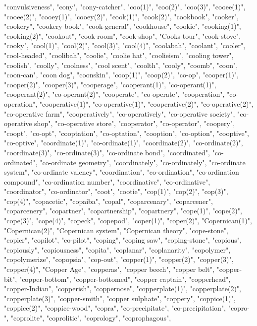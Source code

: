 "convulsiveness",
"cony",
"cony-catcher",
"coo(1)",
"coo(2)",
"coo(3)",
"cooee(1)",
"cooee(2)",
"cooey(1)",
"cooey(2)",
"cook(1)",
"cook(2)",
"cookbook",
"cooker",
"cookery",
"cookery book",
"cook-general",
"cookhouse",
"cookie",
"cooking(1)",
"cooking(2)",
"cookout",
"cook-room",
"cook-shop",
"Cooks tour",
"cook-stove",
"cooky",
"cool(1)",
"cool(2)",
"cool(3)",
"cool(4)",
"coolabah",
"coolant",
"cooler",
"cool-headed",
"coolibah",
"coolie",
"coolie hat",
"coolieism",
"cooling tower",
"coolish",
"coolly",
"coolness",
"cool scent",
"coolth",
"cooly",
"coomb",
"coon",
"coon-can",
"coon dog",
"coonskin",
"coop(1)",
"coop(2)",
"co-op",
"cooper(1)",
"cooper(2)",
"cooper(3)",
"cooperage",
"cooperant(1)",
"co-operant(1)",
"cooperant(2)",
"co-operant(2)",
"cooperate",
"co-operate",
"cooperation",
"co-operation",
"cooperative(1)",
"co-operative(1)",
"cooperative(2)",
"co-operative(2)",
"co-operative farm",
"cooperatively",
"co-operatively",
"co-operative society",
"co-operative shop",
"co-operative store",
"cooperator",
"co-operator",
"coopery",
"coopt",
"co-opt",
"cooptation",
"co-optation",
"cooption",
"co-option",
"cooptive",
"co-optive",
"coordinate(1)",
"co-ordinate(1)",
"coordinate(2)",
"co-ordinate(2)",
"coordinate(3)",
"co-ordinate(3)",
"co-ordinate bond",
"coordinated",
"co-ordinated",
"co-ordinate geometry",
"coordinately",
"co-ordinately",
"co-ordinate system",
"co-ordinate valency",
"coordination",
"co-ordination",
"co-ordination compound",
"co-ordination number",
"coordinative",
"co-ordinative",
"coordinator",
"co-ordinator",
"coot",
"cootie",
"cop(1)",
"cop(2)",
"cop(3)",
"cop(4)",
"copacetic",
"copaiba",
"copal",
"coparcenary",
"coparcener",
"coparcenery",
"copartner",
"copartnership",
"copartnery",
"cope(1)",
"cope(2)",
"cope(3)",
"cope(4)",
"copeck",
"copepod",
"coper(1)",
"coper(2)",
"Copernican(1)",
"Copernican(2)",
"Copernican system",
"Copernican theory",
"cope-stone",
"copier",
"copilot",
"co-pilot",
"coping",
"coping saw",
"coping-stone",
"copious",
"copiously",
"copiousness",
"copita",
"coplanar",
"coplanarity",
"copolymer",
"copolymerize",
"copopsia",
"cop-out",
"copper(1)",
"copper(2)",
"copper(3)",
"copper(4)",
"Copper Age",
"copperas",
"copper beech",
"copper belt",
"copper-bit",
"copper-bottom",
"copper-bottomed",
"copper captain",
"copperhead",
"copper-Indian",
"copperish",
"coppernose",
"copperplate(1)",
"copperplate(2)",
"copperplate(3)",
"copper-smith",
"copper sulphate",
"coppery",
"coppice(1)",
"coppice(2)",
"coppice-wood",
"copra",
"co-precipitate",
"co-precipitation",
"copro-",
"coprolite",
"coprolitic",
"coprology",
"coprophagous",
